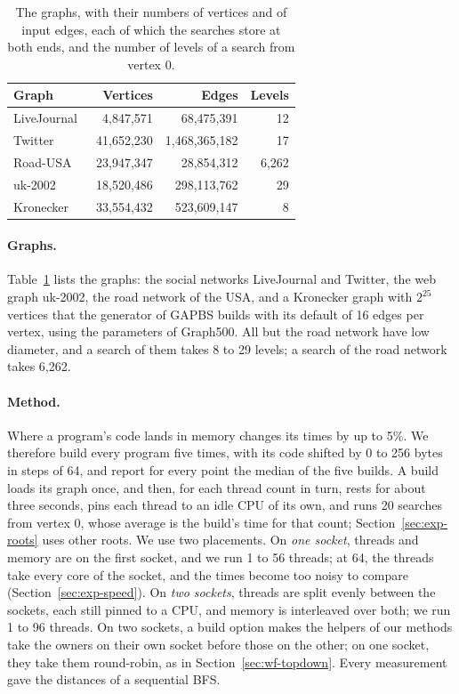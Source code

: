\begin{table}
    \caption{The graphs, with their numbers of vertices and of input edges, each of which the searches store at both ends, and the number of levels of a search from vertex 0.}
    \label{tab:graphs}
    \small
    \begin{tabular}{l r r r}
        \toprule
        Graph & Vertices & Edges & Levels \\
        \midrule
        LiveJournal~\cite{livejournal} & 4,847,571 & 68,475,391 & 12 \\
        Twitter~\cite{kwak_twitter} & 41,652,230 & 1,468,365,182 & 17 \\
        Road-USA~\cite{netrepo} & 23,947,347 & 28,854,312 & 6,262 \\
        uk-2002~\cite{boldi_webgraph, davis_suitesparse} & 18,520,486 & 298,113,762 & 29 \\
        Kronecker~\cite{gapbs, graph500} & 33,554,432 & 523,609,147 & 8 \\
        \bottomrule
    \end{tabular}
\end{table}

\paragraph{Graphs.} Table~\ref{tab:graphs} lists the graphs: the social networks LiveJournal and Twitter, the web graph uk-2002, the road network of the USA, and a Kronecker graph with $2^{25}$ vertices that the generator of GAPBS builds with its default of 16 edges per vertex, using the parameters of Graph500. All but the road network have low diameter, and a search of them takes 8 to 29 levels; a search of the road network takes 6,262.

\paragraph{Method.} Where a program's code lands in memory changes its times by up to 5\%. We therefore build every program five times, with its code shifted by 0 to 256 bytes in steps of 64, and report for every point the median of the five builds. A build loads its graph once, and then, for each thread count in turn, rests for about three seconds, pins each thread to an idle CPU of its own, and runs 20 searches from vertex 0, whose average is the build's time for that count; Section~\ref{sec:exp-roots} uses other roots. We use two placements. On \emph{one socket}, threads and memory are on the first socket, and we run 1 to 56 threads; at 64, the threads take every core of the socket, and the times become too noisy to compare (Section~\ref{sec:exp-speed}). On \emph{two sockets}, threads are split evenly between the sockets, each still pinned to a CPU, and memory is interleaved over both; we run 1 to 96 threads. On two sockets, a build option makes the helpers of our methods take the owners on their own socket before those on the other; on one socket, they take them round-robin, as in Section~\ref{sec:wf-topdown}. Every measurement gave the distances of a sequential BFS.

